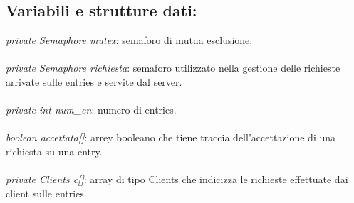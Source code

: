 \documentclass[10pt, a4paper]{article}
\begin{document}
\subsection{Variabili e strutture dati:}
\textit{private Semaphore mutex}: semaforo di mutua esclusione.
\\\\
\textit{private Semaphore richiesta}: semaforo utilizzato nella gestione delle richieste arrivate sulle entries e servite dal server.
\\\\
\textit{private int num\_en}: numero di entries.
\\\\
\textit{boolean accettata[]}: arrey booleano che tiene traccia dell'accettazione di una richiesta su una entry.
\\\\
\textit{private Clients c[]}: array di tipo Clients che indicizza le richieste effettuate dai client sulle entries.
\end{document}
